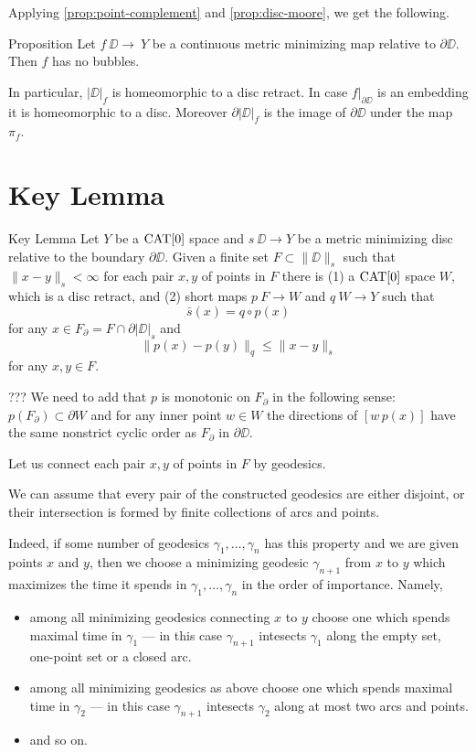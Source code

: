 \documentclass{article}
\begin{document}
Applying \ref{prop:point-complement} and \ref{prop:disc-moore}, we get the following.

\begin{thm}{Proposition}\label{prop:|D|}
Let $f\:\DD\to\ Y$ be a continuous metric minimizing map relative to $\partial \DD$.
Then $f$ has no bubbles.

In particular,  $|\DD|_f$ is homeomorphic to a disc retract. 
In case $f|_{\partial\DD}$ is an
embedding it is homeomorphic to a disc.
Moreover $\partial|\DD|_f$ is the image of $\partial \DD$
under the map $\pi_f$.
\end{thm}











\section{Key Lemma}\label{Key Lemma}


\begin{thm}{Key Lemma}\label{lem:key}
Let $Y$ be a $\mathop{\rm CAT}\nolimits[0]$ space and $s\:\DD\to Y$ 
be a metric minimizing disc relative to the boundary $\partial \DD$.
Given a finite set $F\subset \|\DD\|_s$ such that $\|x-y\|_s<\infty$ for each pair $x,y$ of points in $F$
there is 
(1) a $\mathop{\rm CAT}\nolimits[0]$ space $W$, which is a disc retract,
and (2) short maps $p\:F\to W$ and $q\:W\to Y$ such that
\[\bar s(x)=q\circ p(x)\] 
for any $x\in F_{\partial}=F\cap \partial |\DD|_s$
and 
\[\|p(x)-p(y)\|_q\le \|x-y\|_s\] 
for any $x,y\in F$.
\end{thm}

??? We need to add that $p$ is monotonic on $F_{\partial}$ in the following sense:
$p(F_\partial)\subset \partial W$ and for any inner point $w\in W$ the directions of $[w\,p(x)]$ have the same nonstrict cyclic order as  $F_{\partial}$ in $\partial\DD$. 

Let us connect each pair $x,y$ of points in $F$ by geodesics.

We can assume that 
every pair of the constructed geodesics 
are either disjoint, or their intersection is formed by finite collections of arcs and points.

Indeed, if some number of geodesics $\gamma_1,\dots,\gamma_n$ has this property and we are given points $x$ and $y$, then
we choose a minimizing geodesic $\gamma_{n+1}$ from $x$ to $y$ which maximizes the time it spends in $\gamma_1,\dots,\gamma_n$  in the order of importance.
Namely, 
\begin{itemize}
\item  among all minimizing geodesics connecting $x$ to $y$
choose one which spends maximal time in $\gamma_1$ --- in this case $\gamma_{n+1}$ intesects $\gamma_1$ along the empty set, one-point set or a closed arc.
\item among all minimizing geodesics as above
choose one which spends maximal time in $\gamma_2$ --- in this case $\gamma_{n+1}$ intesects $\gamma_2$ along at most two arcs and points.
\item and so on.
\end{itemize}
\end{document}
